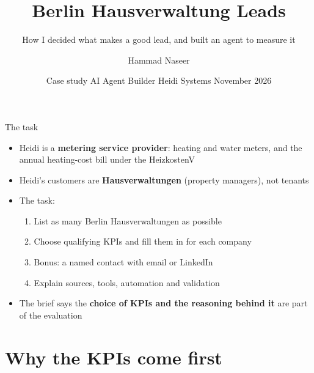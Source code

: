 \documentclass[aspectratio=169,11pt]{beamer}
\title{Berlin Hausverwaltung Leads}
\subtitle{How I decided what makes a good lead, and built an agent to measure it}
\author{Hammad Naseer}
\date{Case study \textbullet{} AI Agent Builder \textbullet{} Heidi Systems \textbullet{} November 2026}
\begin{document}
\begin{frame}
  \titlepage
\end{frame}

\begin{frame}{The task}
  \begin{itemize}
    \item Heidi is a \textbf{metering service provider}: heating and water meters, and the
          annual heating-cost bill under the HeizkostenV
    \item Heidi's customers are \textbf{Hausverwaltungen} (property managers), not tenants
    \item The task:
      \begin{enumerate}
        \item List as many Berlin Hausverwaltungen as possible
        \item Choose qualifying KPIs and fill them in for each company
        \item Bonus: a named contact with email or LinkedIn
        \item Explain sources, tools, automation and validation
      \end{enumerate}
    \item The brief says the \textbf{choice of KPIs and the reasoning behind it} are part of
          the evaluation
  \end{itemize}
\end{frame}

\section{Why the KPIs come first}
\end{document}
